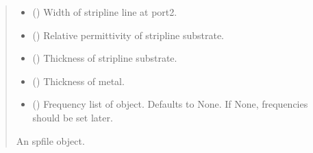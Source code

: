 \documentclass[letterpaper,10pt,english]{sphinxmanual}
\begin{document}
\begin{fulllineitems}
\begin{fulllineitems}
\begin{quote}
\begin{description}
\begin{itemize}
\item {}
\sphinxAtStartPar
{} () \textendash{} Width of stripline line at port\sphinxhyphen{}2.

\item {}
\sphinxAtStartPar
{} () \textendash{} Relative permittivity of stripline substrate.

\item {}
\sphinxAtStartPar
{} () \textendash{} Thickness of stripline substrate.

\item {}
\sphinxAtStartPar
{} () \textendash{} Thickness of metal.

\item {}
\sphinxAtStartPar
{} (\sphinxstyleliteralemphasis{\sphinxupquote{, }}) \textendash{} Frequency list of object. Defaults to None. If None, frequencies should be set later.

\end{itemize}

\sphinxAtStartPar
An spfile object.

\sphinxAtStartPar
{\hyperref[\detokenize{touchstone:touchstone.spfile}]{}}

\end{description}\end{quote}

\end{fulllineitems}



\end{fulllineitems}
\end{document}
